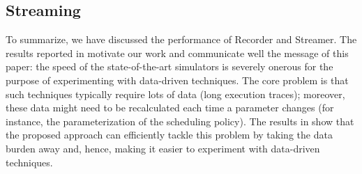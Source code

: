 \subsection{Streaming}


To summarize, we have discussed the performance of Recorder and Streamer. The
results reported in  motivate our work and communicate well the
message of this paper: the speed of the state-of-the-art simulators is severely
onerous for the purpose of experimenting with data-driven techniques. The core
problem is that such techniques typically require lots of data (long execution
traces); moreover, these data might need to be recalculated each time a
parameter changes (for instance, the parameterization of the scheduling policy).
The results in  show that the proposed approach can efficiently
tackle this problem by taking the data burden away and, hence, making it easier
to experiment with data-driven techniques.
